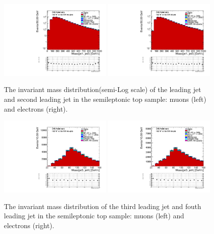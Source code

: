 \begin{figure}[htb] 
  {\centering
    \includegraphics[width=0.49\textwidth]{figs/topwjes/mu_EWK_W_2jets_ttbar_firstsecondmjj_TTbarControlPlots_logy_EWKW2jets.pdf}
    \includegraphics[width=0.49\textwidth]{figs/topwjes/el_EWK_W_2jets_ttbar_firstsecondmjj_TTbarControlPlots_met_30_WmT_30_logy_EWKW2jets.pdf}
    \caption{The invariant mass distribution(semi-Log scale) of the leading jet and second leading jet in the semileptonic top sample: muons (left) and electrons (right).}
    \label{fig:topw:massj1j2logy}}
\end{figure}
\begin{figure}[htb] 
  {\centering
    \includegraphics[width=0.49\textwidth]{figs/topwjes/mu_EWK_W_2jets_ttbar_thirdfourthmjj_TTbarControlPlots_EWKW2jets.pdf}
    \includegraphics[width=0.49\textwidth]{figs/topwjes/el_EWK_W_2jets_ttbar_thirdfourthmjj_TTbarControlPlots_met_30_WmT_30_EWKW2jets.pdf}
    \caption{The invariant mass distribution of the third leading jet and fouth leading jet in the semileptonic top sample: muons (left) and electrons (right).}
    \label{fig:topw:massj3j4}}
\end{figure}

\clearpage
